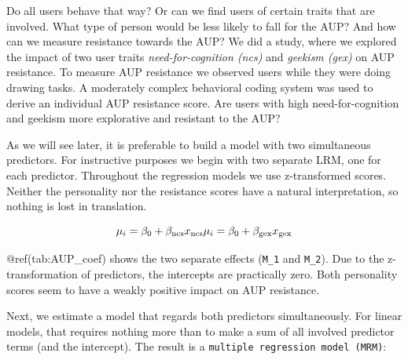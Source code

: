 \documentclass[]{svmono}
\newenvironment{Shaded}{\begin{snugshade}}{\end{snugshade}}
\newcommand{\KeywordTok}[1]{\textcolor[rgb]{0.13,0.29,0.53}{\textbf{#1}}}
\newcommand{\DataTypeTok}[1]{\textcolor[rgb]{0.13,0.29,0.53}{#1}}
\newcommand{\DecValTok}[1]{\textcolor[rgb]{0.00,0.00,0.81}{#1}}
\newcommand{\StringTok}[1]{\textcolor[rgb]{0.31,0.60,0.02}{#1}}
\newcommand{\OperatorTok}[1]{\textcolor[rgb]{0.81,0.36,0.00}{\textbf{#1}}}
\newcommand{\NormalTok}[1]{#1}
\theoremstyle{definition}
\theoremstyle{definition}
\theoremstyle{definition}
\theoremstyle{remark}
\begin{document}
Do all users behave that way? Or can we find users of certain traits
that are involved. What type of person would be less likely to fall for
the AUP? And how can we measure resistance towards the AUP? We did a
study, where we explored the impact of two user traits
\emph{need-for-cognition (ncs)} and \emph{geekism (gex)} on AUP
resistance. To measure AUP resistance we observed users while they were
doing drawing tasks. A moderately complex behavioral coding system was
used to derive an individual AUP resistance score. Are users with high
need-for-cognition and geekism more explorative and resistant to the
AUP?

As we will see later, it is preferable to build a model with two
simultaneous predictors. For instructive purposes we begin with two
separate LRM, one for each predictor. Throughout the regression models
we use z-transformed scores. Neither the personality nor the resistance
scores have a natural interpretation, so nothing is lost in translation.

\[
\mu_i = \beta_0 + \beta_\mathrm{ncs} x_\mathrm{ncs}\\
\mu_i = \beta_0 + \beta_\mathrm{gex} x_\mathrm{gex}
\]

\begin{Shaded}
\end{Shaded}

@ref(tab:AUP\_coef) shows the two separate effects (\texttt{M\_1} and
\texttt{M\_2}). Due to the z-transformation of predictors, the
intercepts are practically zero. Both personality scores seem to have a
weakly positive impact on AUP resistance.

Next, we estimate a model that regards both predictors simultaneously.
For linear models, that requires nothing more than to make a sum of all
involved predictor terms (and the intercept). The result is a
\texttt{multiple\ regression\ model\ (MRM)}:
\end{document}
